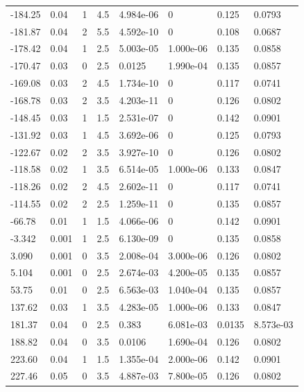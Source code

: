 \documentclass[preview]{standalone}
\begin{document}
{{\begin{tabular}{L{1.2cm}C{1.2cm} C{0.3cm}C{0.5cm} C{1.4cm}C{1.4cm} C{1.4cm}C{1.4cm}}
  -184.25  &  0.04  & 1     & 4.5 &  4.984e-06  & 0  & 0.125 &  0.0793   \\ 
  -181.87  &  0.04  & 2     & 5.5 &  4.592e-10  & 0  & 0.108 &  0.0687   \\ 
  -178.42  &  0.04  & 1     & 2.5 &  5.003e-05  & 1.000e-06  & 0.135 &  0.0858   \\ 
  -170.47  &  0.03  & 0     & 2.5 &  0.0125  & 1.990e-04  & 0.135 &  0.0857   \\ 
  -169.08  &  0.03  & 2     & 4.5 &  1.734e-10  & 0  & 0.117 &  0.0741   \\ 
  -168.78  &  0.03  & 2     & 3.5 &  4.203e-11  & 0  & 0.126 &  0.0802   \\ 
  -148.45  &  0.03  & 1     & 1.5 &  2.531e-07  & 0  & 0.142 &  0.0901   \\ 
  -131.92  &  0.03  & 1     & 4.5 &  3.692e-06  & 0  & 0.125 &  0.0793   \\ 
  -122.67  &  0.02  & 2     & 3.5 &  3.927e-10  & 0  & 0.126 &  0.0802   \\ 
  -118.58  &  0.02  & 1     & 3.5 &  6.514e-05  & 1.000e-06  & 0.133 &  0.0847   \\ 
  -118.26  &  0.02  & 2     & 4.5 &  2.602e-11  & 0  & 0.117 &  0.0741   \\ 
  -114.55  &  0.02  & 2     & 2.5 &  1.259e-11  & 0  & 0.135 &  0.0857   \\ 
  -66.78  &  0.01  & 1     & 1.5 &  4.066e-06  & 0  & 0.142 &  0.0901   \\ 
  -3.342  &  0.001  & 1     & 2.5 &  6.130e-09  & 0  & 0.135 &  0.0858   \\ 
  3.090  &  0.001  & 0     & 3.5 &  2.008e-04  & 3.000e-06  & 0.126 &  0.0802   \\ 
  5.104  &  0.001  & 0     & 2.5 &  2.674e-03  & 4.200e-05  & 0.135 &  0.0857   \\ 
  53.75  &  0.01  & 0     & 2.5 &  6.563e-03  & 1.040e-04  & 0.135 &  0.0857   \\ 
  137.62  &  0.03  & 1     & 3.5 &  4.283e-05  & 1.000e-06  & 0.133 &  0.0847   \\ 
  181.37  &  0.04  & 0     & 2.5 &  0.383  & 6.081e-03  & 0.0135 &  8.573e-03   \\ 
  188.82  &  0.04  & 0     & 3.5 &  0.0106  & 1.690e-04  & 0.126 &  0.0802   \\ 
  223.60  &  0.04  & 1     & 1.5 &  1.355e-04  & 2.000e-06  & 0.142 &  0.0901   \\ 
  227.46  &  0.05  & 0     & 3.5 &  4.887e-03  & 7.800e-05  & 0.126 &  0.0802   \\ 

\end{tabular}}}
\end{document}
